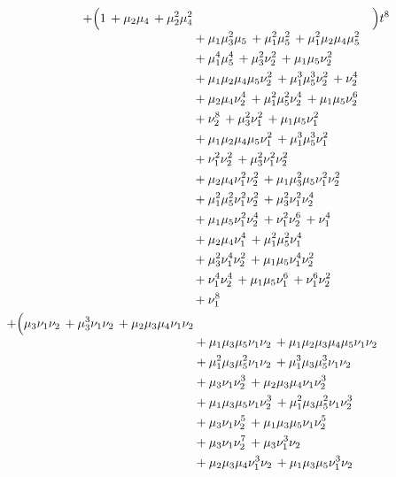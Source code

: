 \documentclass[10pt]{article}
\begin{document}
\[\begin{aligned}
  + \Bigl(\begin{aligned}[t]1\,+\mu_2\mu_4\,+\mu_2^{2}\mu_4^{2} \\
  &{}+\mu_1\mu_3^{2}\mu_5\,+\mu_1^{2}\mu_5^{2}\,+\mu_1^{2}\mu_2\mu_4\mu_5^{2} \\
  &{}+\mu_1^{4}\mu_5^{4}\,+\mu_3^{2}\nu_2^{2}\,+\mu_1\mu_5\nu_2^{2} \\
  &{}+\mu_1\mu_2\mu_4\mu_5\nu_2^{2}\,+\mu_1^{3}\mu_5^{3}\nu_2^{2}\,+\nu_2^{4} \\
  &{}+\mu_2\mu_4\nu_2^{4}\,+\mu_1^{2}\mu_5^{2}\nu_2^{4}\,+\mu_1\mu_5\nu_2^{6} \\
  &{}+\nu_2^{8}\,+\mu_3^{2}\nu_1^{2}\,+\mu_1\mu_5\nu_1^{2} \\
  &{}+\mu_1\mu_2\mu_4\mu_5\nu_1^{2}\,+\mu_1^{3}\mu_5^{3}\nu_1^{2} \\
  &{}+\nu_1^{2}\nu_2^{2}\,+\mu_3^{2}\nu_1^{2}\nu_2^{2} \\
  &{}+\mu_2\mu_4\nu_1^{2}\nu_2^{2}\,+\mu_1\mu_3^{2}\mu_5\nu_1^{2}\nu_2^{2} \\
  &{}+\mu_1^{2}\mu_5^{2}\nu_1^{2}\nu_2^{2}\,+\mu_3^{2}\nu_1^{2}\nu_2^{4} \\
  &{}+\mu_1\mu_5\nu_1^{2}\nu_2^{4}\,+\nu_1^{2}\nu_2^{6}\,+\nu_1^{4} \\
  &{}+\mu_2\mu_4\nu_1^{4}\,+\mu_1^{2}\mu_5^{2}\nu_1^{4} \\
  &{}+\mu_3^{2}\nu_1^{4}\nu_2^{2}\,+\mu_1\mu_5\nu_1^{4}\nu_2^{2} \\
  &{}+\nu_1^{4}\nu_2^{4}\,+\mu_1\mu_5\nu_1^{6}\,+\nu_1^{6}\nu_2^{2} \\
  &{}+\nu_1^{8}\end{aligned}\Bigr)t^{8} \\
  + \Bigl(\begin{aligned}[t]\mu_3\nu_1\nu_2\,+\mu_3^{3}\nu_1\nu_2\,+\mu_2\mu_3\mu_4\nu_1\nu_2 \\
  &{}+\mu_1\mu_3\mu_5\nu_1\nu_2\,+\mu_1\mu_2\mu_3\mu_4\mu_5\nu_1\nu_2 \\
  &{}+\mu_1^{2}\mu_3\mu_5^{2}\nu_1\nu_2\,+\mu_1^{3}\mu_3\mu_5^{3}\nu_1\nu_2 \\
  &{}+\mu_3\nu_1\nu_2^{3}\,+\mu_2\mu_3\mu_4\nu_1\nu_2^{3} \\
  &{}+\mu_1\mu_3\mu_5\nu_1\nu_2^{3}\,+\mu_1^{2}\mu_3\mu_5^{2}\nu_1\nu_2^{3} \\
  &{}+\mu_3\nu_1\nu_2^{5}\,+\mu_1\mu_3\mu_5\nu_1\nu_2^{5} \\
  &{}+\mu_3\nu_1\nu_2^{7}\,+\mu_3\nu_1^{3}\nu_2 \\
  &{}+\mu_2\mu_3\mu_4\nu_1^{3}\nu_2\,+\mu_1\mu_3\mu_5\nu_1^{3}\nu_2 \\

\end{aligned}
\end{aligned}\]
\end{document}
